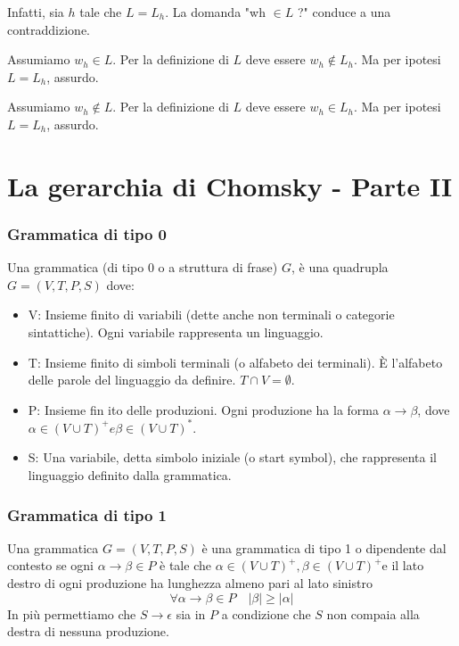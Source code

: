 Infatti, sia $h$ tale che $L=L_{h}$. La domanda "wh $\in L$ ?" conduce a una contraddizione.

Assumiamo $w_{h} \in L$. Per la definizione di $L$ deve essere $w_{h} \notin L_{h} .$ Ma per ipotesi $L=L_{h}$, assurdo.

Assumiamo $w_{h} \notin L$. Per la definizione di $L$ deve essere $w_{h} \in L_{h}$. Ma per ipotesi $L=L_{h}$, assurdo.

\section{La gerarchia di Chomsky -
Parte II}

\subsubsection{Grammatica di tipo 0}

Una grammatica (di tipo 0 o a struttura di frase) $G$, è una quadrupla $G=(V, T, P, S)$ dove:
\begin{itemize}
    \item V: Insieme finito di variabili (dette anche non terminali o categorie sintattiche). Ogni variabile rappresenta un linguaggio.
    \item T: Insieme finito di simboli terminali (o alfabeto dei terminali). È l'alfabeto delle parole del linguaggio da definire. $T \cap V=\emptyset$.
    \item P: Insieme fin ito delle produzioni. Ogni produzione ha la forma $\alpha \rightarrow \beta$, dove $\alpha \in(V \cup T)^{+} e \beta \in(V \cup T)^{*}$.
    \item S: Una variabile, detta simbolo iniziale (o start symbol), che rappresenta il linguaggio definito dalla grammatica.
\end{itemize}

\subsubsection{Grammatica di tipo 1}
Una grammatica $G=(V, T, P, S)$ è una grammatica di tipo 1 o dipendente dal contesto se ogni $\alpha \rightarrow \beta \in P$ è tale che $\alpha \in(V \cup T)^{+}, \beta \in(V \cup T)^{+}$e il lato destro di ogni produzione ha lunghezza almeno pari al lato sinistro
$$
\forall \alpha \rightarrow \beta \in P \quad|\beta| \geq|\alpha|
$$
In più permettiamo che $S \rightarrow \epsilon$ sia in $P$ a condizione che $S$ non compaia alla destra di nessuna produzione.

